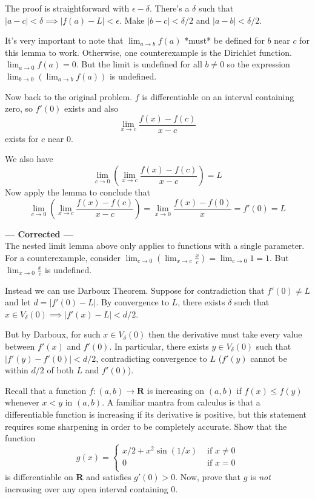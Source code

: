 \documentclass{oxmathproblems}
\begin{document}
\begin{questions}
\begin{solution}
\begin{enumerate}[label=(\alph*)]
    The proof is straightforward with $\epsilon-\delta$. There's a $\delta$ such that $|a-c| < \delta \implies |f(a)-L| < \epsilon$.
    Make $|b-c|< \delta/2$ and $|a-b| < \delta/2$.

    It's very important to note that $\lim_{a \to b}f(a)$ *must* be defined for $b$ near $c$ for this lemma to work. Otherwise,
    one counterexample is the Dirichlet function. $\lim_{a \to 0}f(a)=0$. But the limit is undefined for all $b \neq 0$ so the expression
    $\lim_{b \to 0}(\lim_{a \to b}f(a))$ is undefined.

    Now back to the original problem. $f$ is differentiable on an interval containing zero, so $f'(0)$ exists and also
    \[\lim_{x \to c}\frac{f(x)-f(c)}{x-c}\]
    exists for $c$ near $0$.

    We also have
    \[\lim_{c \to 0}\left( \lim_{x \to c}\frac{f(x)-f(c)}{x-c}\right)=L\]
    Now apply the lemma to conclude that
    \[\lim_{c \to 0}\left( \lim_{x \to c}\frac{f(x)-f(c)}{x-c}\right)=\lim_{x \to 0}\frac{f(x)-f(0)}{x}=f'(0)=L\]
  
    \textbf{--- Corrected ---}\\
    The nested limit lemma above only applies to functions with a single parameter. For a counterexample, consider
    $\lim_{c \to 0}(\lim_{x \to c}\frac{x}{c}) = \lim_{c \to 0}1 = 1$.
    But $\lim_{x \to 0}\frac{x}{c}$ is undefined.

    Instead we can use Darboux Theorem. Suppose for contradiction that $f'(0) \neq L$ and let $d = |f'(0)-L|$. By convergence to $L$, there exists $\delta$ such that
    $x \in V_{\delta}(0) \implies |f'(x)-L| < d/2$.
    
    But by Darboux, for such $x \in V_{\delta}(0)$ then the derivative must take every value between
    $f'(x)$ and $f'(0)$. In particular, there exists $y \in V_{\delta}(0)$ such that $|f'(y)-f'(0)| < d/2$, contradicting convergence to $L$ ($f'(y)$
    cannot be within $d/2$ of both $L$ and $f'(0)$).
  \end{enumerate}
\end{solution}

\miquestion Recall that a function $f: (a, b) \to \textbf{R}$ is increasing on $(a, b)$ if $f(x) \leq f(y)$ whenever $x < y$ in $(a, b)$.
A familiar mantra from calculus is that a differentiable function is increasing if its derivative is positive, but this statement requires some sharpening
in order to be completely accurate. Show that the function
\[
  g(x) = 
  \begin{cases}
    x/2 + x^2\sin(1/x) & \text{ if } x \neq 0\\
    0 & \text{ if } x=0\\
  \end{cases}
\]
is differentiable on \textbf{R} and satisfies $g'(0) > 0$. Now, prove that $g$ is \textit{not} increasing over any open interval containing 0.


\end{questions}
\end{document}
